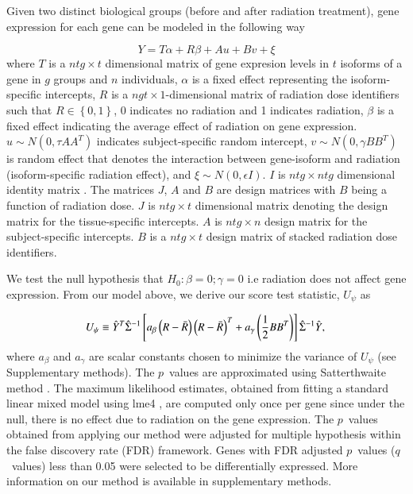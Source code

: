 \documentclass[hidelinks,11pt]{article}
\begin{document}
Given two distinct biological groups (before and after radiation treatment), gene expression for each gene can be modeled in the following way

\begin{equation}
Y = T \alpha + R\beta + Au + Bv + \xi
\end{equation}
where $T$ is a $ntg \times t$ dimensional matrix of gene expresion levels in $t$ isoforms of a gene in $g$ groups and $n$ individuals, $\alpha$ is a fixed effect representing the isoform-specific intercepts, $R$ is a $ngt \times 1$-dimensional matrix of radiation dose identifiers such that $R\in\left\{0,1\right\}$, 0 indicates no radiation and 1 indicates radiation, $\beta$ is a fixed effect indicating the average effect of radiation on gene expression. $u \sim N\left(0, \tau AA^T \right)$ indicates subject-specific random intercept, $v \sim N\left(0,\gamma BB^T \right)$ is random effect that denotes the interaction between gene-isoform and radiation (isoform-specific radiation effect), and $\xi \sim N\left(0, \epsilon I \right)$. $I$ is $ntg \times ntg$ dimensional identity matrix . The matrices $J$, $A$ and $B$ are design matrices with $B$ being a function of radiation dose. $J$ is $ntg \times t$ dimensional matrix denoting the design matrix for the tissue-specific intercepts. $A$ is $ntg \times n$ design matrix for the subject-specific intercepts. $B$ is a $ntg \times t$ design matrix of stacked radiation dose identifiers.

We test the null hypothesis that  $H_0: \beta = 0; \gamma=0$ i.e radiation does not affect gene expression. From our model above, we derive our score test statistic, $U_\psi$ as

\begin{equation}
U_\psi \equiv \hat{Y}^T  \hat{\Sigma}^{-1} \left[ a_\beta \left(R - \bar{R} \right) \left(R - \bar{R} \right)^T   + a_\gamma \left( \frac{1}{2} B B^T \right) \right]  \hat{\Sigma}^{-1} \hat{Y}, \\
\end{equation}
where ${a_\beta}$ and ${a_\gamma}$ are scalar constants chosen to minimize the variance of $U_\psi$ (see Supplementary methods). The $p$~values are approximated using Satterthwaite method \cite{satterthwaite}. The maximum likelihood estimates, obtained from fitting a standard linear mixed model using lme4 \cite{lme4}, are computed only once per gene since under the null, there is no effect due to radiation on the gene expression. The $p$~values obtained from applying our method were adjusted for multiple hypothesis within the false discovery rate (FDR) framework. Genes with FDR adjusted $p$~values ($q$~values) less than 0.05 were selected to be differentially expressed. More information on our method is available in supplementary methods. 
\end{document}
